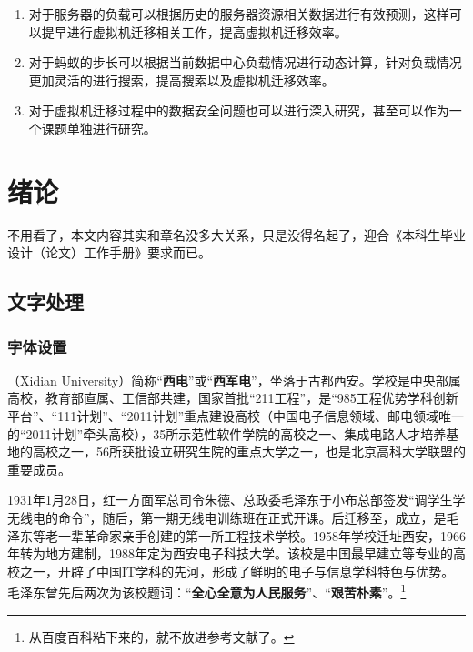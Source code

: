 \begin{enumerate}
    \item 对于服务器的负载可以根据历史的服务器资源相关数据进行有效预测，这样可以提早进行虚拟机迁移相关工作，提高虚拟机迁移效率。
    \item 对于蚂蚁的步长可以根据当前数据中心负载情况进行动态计算，针对负载情况更加灵活的进行搜索，提高搜索以及虚拟机迁移效率。
    \item 对于虚拟机迁移过程中的数据安全问题也可以进行深入研究，甚至可以作为一个课题单独进行研究。
\end{enumerate}


























\chapter{绪论}
不用看了，本文内容其实和章名没多大关系，只是没得名起了，迎合《本科生毕业设计（论文）工作手册》要求而已。

\section{文字处理}

\subsection{字体设置}
\textbf{}（Xidian University）简称“\textbf{西电}”或“\textbf{西军电}”，坐落于古都西安。学校是中央部属高校，教育部直属、工信部共建，国家首批“{\heiti 211工程}”，是“{\fangsong 985工程优势学科创新平台}”、“111计划”、“2011计划”重点建设高校{\youyuan （中国电子信息领域、邮电领域唯一的“2011计划”牵头高校）}，35所示范性软件学院的高校之一、集成电路人才培养基地的高校之一，56所获批设立研究生院的重点大学之一，也是{\lishu 北京高科大学联盟}的重要成员。 

1931年1月28日，红一方面军{\yahei 总司令朱德、总政委毛泽东}于小布总部签发“调学生学无线电的命令”，随后，第一期无线电训练班在正式开课。后迁移至，成立，是毛泽东等老一辈革命家亲手创建的第一所工程技术学校。1958年学校迁址西安，1966年转为地方建制，1988年定为西安电子科技大学。该校是中国最早建立等专业的高校之一，开辟了中国IT学科的先河，形成了鲜明的电子与信息学科特色与优势。毛泽东曾先后两次为该校题词：“\textbf{\large 全心全意为人民服务}”、“\textbf{\large 艰苦朴素}”。\footnote{从百度百科粘下来的，就不放进参考文献了。}

